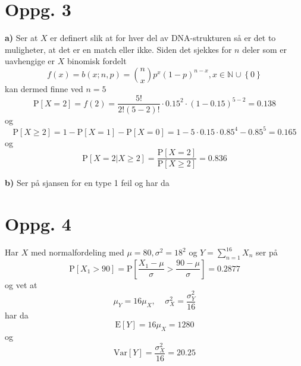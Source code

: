 \documentclass{report}
\newcommand{\M}[2]{\mathbb{#1}^{#2}}
\newcommand{\bbrack}[1]{\left[ #1 \right]}
\newcommand{\cbrack}[1]{\left\lbrace #1 \right\rbrace}
\newcommand{\Var}[1]{\text{Var} \bbrack{ #1 }}
\newcommand{\std}[1]{\text{E} \bbrack{ #1 }}
\newcommand{\Prob}[1]{\text{P} \bbrack{ #1 }}
\begin{document}
\section*{Oppg. 3}
\textbf{a)}
Ser at $X$ er definert slik at for hver del av DNA-strukturen så er det to muligheter, at det er en match eller ikke. Siden det sjekkes for $n$ deler som er uavhengige er $X$ binomisk fordelt
\begin{equation}
  \label{eq:4}
  f(x) = b(x; n, p) = \binom{n}{x} p^{x}(1-p)^{n-x}, x \in \M{N}{} \cup \cbrack{0}
\end{equation}
kan dermed finne ved $n=5$
\begin{equation}
  \label{eq:14}
  \Prob{X=2} = f(2) = \frac{5!}{2!(5-2)!} \cdot 0.15^{2} \cdot (1-0.15)^{5-2} = 0.138
\end{equation}
og
\begin{equation}
  \label{eq:15}
  \Prob{X \geq 2} = 1 - \Prob{X=1} - \Prob{X=0} = 1 - 5\cdot 0.15 \cdot 0.85^{4} - 0.85^{5} = 0.165
\end{equation}
og
\begin{equation}
  \label{eq:16}
  \Prob{X = 2 | X \geq 2} = \frac{\Prob{X=2}}{\Prob{X \geq 2}} = 0.836
\end{equation}

\textbf{b)}
Ser på sjansen for en type 1 feil og har da



\section*{Oppg. 4}
Har $X$ med normalfordeling med $\mu = 80, \sigma^{2} = 18^{2}$ og $Y = \sum_{n=1}^{16} X_{n}$ ser på
\begin{equation}
  \label{eq:17}
  \Prob{X_{1} > 90} = \Prob{\frac{X_{1} - \mu}{\sigma} > \frac{90-\mu}{\sigma}} = 0.2877
\end{equation}
og vet at
\begin{equation}
  \label{eq:21}
  \mu_{Y} = 16 \mu_{X}, \;\;\;\; \sigma_{X}^{2} = \frac{\sigma_{Y}^{2}}{16}
\end{equation}
har da
\begin{equation}
  \label{eq:22}
  \std{Y} = 16\mu_{X} = 1280
\end{equation}
og
\begin{equation}
  \label{eq:23}
  \Var{Y} = \frac{\sigma_{X}^{2}}{16} = 20.25
\end{equation}
\end{document}

